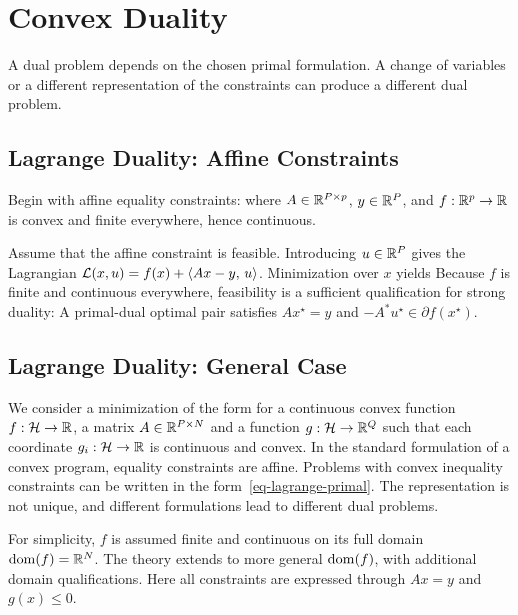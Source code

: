 \section{Convex Duality}
\label{sec-cvx-duality}

A dual problem depends on the chosen primal formulation. A change of variables or a different representation of the constraints can produce a different dual problem.

\subsection{Lagrange Duality: Affine Constraints}

Begin with affine equality constraints:
where $A\in\mathbb{R}^{P\times p}$, $y\in\mathbb{R}^P$, and $f : \mathbb{R}^p \rightarrow \mathbb{R}$ is convex and finite everywhere, hence continuous.

Assume that the affine constraint is feasible. Introducing $u\in\mathbb{R}^P$ gives the Lagrangian $\mathcal{L}(x,u)=f(x)+\langle Ax-y,\,u\rangle$. Minimization over $x$ yields
Because $f$ is finite and continuous everywhere, feasibility is a sufficient qualification for strong duality:
A primal-dual optimal pair satisfies $Ax^\star=y$ and $-A^*u^\star\in\partial f(x^\star)$.

\subsection{Lagrange Duality: General Case}

We consider a minimization of the form
for a continuous convex function $f : \mathcal{H} \rightarrow \mathbb{R}$, a matrix $A \in \mathbb{R}^{P \times N}$ and a function $g : \mathcal{H} \rightarrow \mathbb{R}^Q$ such that each coordinate $g_i : \mathcal{H} \rightarrow \mathbb{R}$ is continuous and convex.
%
In the standard formulation of a convex program, equality constraints are affine.
%
Problems with convex inequality constraints can be written in the form~\eqref{eq-lagrange-primal}. The representation is not unique, and different formulations lead to different dual problems.

For simplicity, $f$ is assumed finite and continuous on its full domain $\operatorname{dom}(f)=\mathbb{R}^N$.
%
The theory extends to more general $\operatorname{dom}(f)$, with additional domain qualifications. Here all constraints are expressed through $Ax=y$ and $g(x) \leq 0$.


